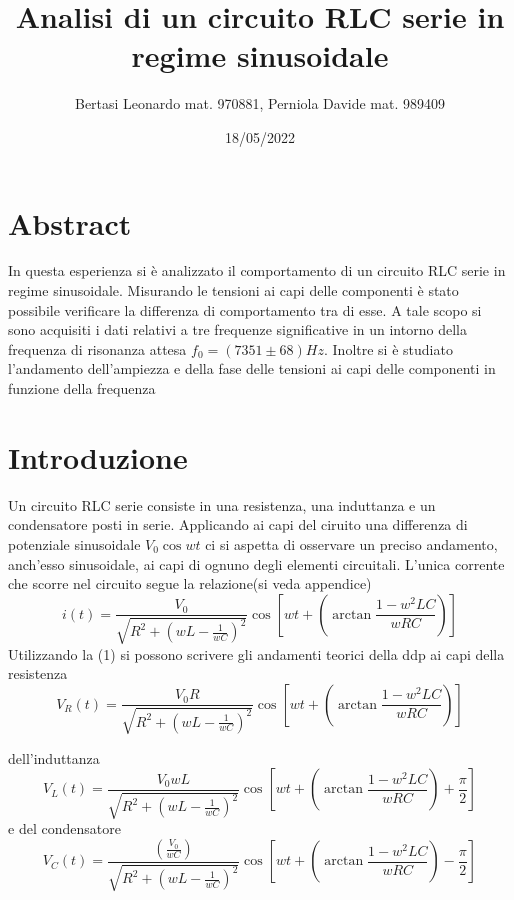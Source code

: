 \documentclass{article}
\title{Analisi di un circuito RLC serie in regime sinusoidale}
\date{18/05/2022}
\author{Bertasi Leonardo mat. 970881, Perniola Davide mat. 989409}
\begin{document}
\maketitle
\section{Abstract} 
In questa esperienza si è analizzato il comportamento di un circuito RLC serie in regime sinusoidale. Misurando le tensioni ai capi delle componenti è stato possibile
verificare la differenza di comportamento tra di esse. A tale scopo si sono acquisiti i dati relativi a tre frequenze significative in un intorno della frequenza di risonanza attesa $f_0=(7351\pm68)Hz$.
Inoltre si è studiato l'andamento dell'ampiezza e della fase delle tensioni ai capi delle componenti in funzione della frequenza


\section{Introduzione} 
Un circuito RLC serie consiste in una resistenza, una induttanza e un condensatore posti in serie. Applicando ai capi del ciruito una differenza di potenziale sinusoidale $V_{0}\cos{wt} $ ci si aspetta di osservare un preciso andamento, anch'esso sinusoidale,
 ai capi di ognuno degli elementi circuitali. L'unica corrente che scorre nel circuito segue la relazione(si veda appendice) 
\begin{equation}
  i(t)=\frac{V_{0}}{\sqrt{R^2+(wL-\frac{1}{wC})^2}}\cos{[wt+(\arctan{\frac{1-w^2LC}{wRC}})]}
\end{equation}
Utilizzando la (1) si possono scrivere gli andamenti teorici della ddp ai capi della resistenza
\begin{equation}
 V_{R}(t)= \frac{V_{0}R}{\sqrt{R^2+(wL-\frac{1}{wC})^2}}\cos{[wt+(\arctan{\frac{1-w^2LC}{wRC}})]}
\end{equation}

dell'induttanza
\begin{equation}
  V_{L}(t)=\frac{V_{0}wL}{\sqrt{R^2+(wL-\frac{1}{wC})^2}}\cos{[wt+(\arctan{\frac{1-w^2LC}{wRC}})+\frac{\pi}{2}]}
\end{equation}
e del condensatore
\begin{equation}
  V_{C}(t)=\frac{(\frac{V_{0}}{wC})}{\sqrt{R^2+(wL-\frac{1}{wC})^2}}\cos{[wt+(\arctan{\frac{1-w^2LC}{wRC}})-\frac{\pi}{2}]}
\end{equation} 
\end{document}
